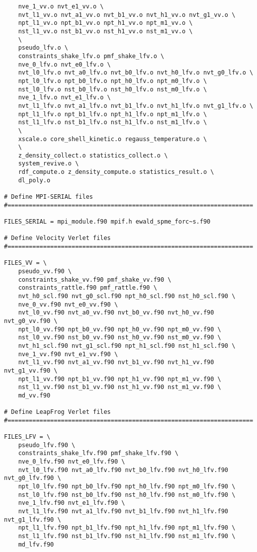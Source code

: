\begin{verbatim}
	nve_1_vv.o nvt_e1_vv.o \
	nvt_l1_vv.o nvt_a1_vv.o nvt_b1_vv.o nvt_h1_vv.o nvt_g1_vv.o \
	npt_l1_vv.o npt_b1_vv.o npt_h1_vv.o npt_m1_vv.o \
	nst_l1_vv.o nst_b1_vv.o nst_h1_vv.o nst_m1_vv.o \
	\
	pseudo_lfv.o \
	constraints_shake_lfv.o pmf_shake_lfv.o \
	nve_0_lfv.o nvt_e0_lfv.o \
	nvt_l0_lfv.o nvt_a0_lfv.o nvt_b0_lfv.o nvt_h0_lfv.o nvt_g0_lfv.o \
	npt_l0_lfv.o npt_b0_lfv.o npt_h0_lfv.o npt_m0_lfv.o \
	nst_l0_lfv.o nst_b0_lfv.o nst_h0_lfv.o nst_m0_lfv.o \
	nve_1_lfv.o nvt_e1_lfv.o \
	nvt_l1_lfv.o nvt_a1_lfv.o nvt_b1_lfv.o nvt_h1_lfv.o nvt_g1_lfv.o \
	npt_l1_lfv.o npt_b1_lfv.o npt_h1_lfv.o npt_m1_lfv.o \
	nst_l1_lfv.o nst_b1_lfv.o nst_h1_lfv.o nst_m1_lfv.o \
	\
	xscale.o core_shell_kinetic.o regauss_temperature.o \
	\
	z_density_collect.o statistics_collect.o \
	system_revive.o \
	rdf_compute.o z_density_compute.o statistics_result.o \
	dl_poly.o

# Define MPI-SERIAL files
#=====================================================================

FILES_SERIAL = mpi_module.f90 mpif.h ewald_spme_forc~s.f90

# Define Velocity Verlet files
#=====================================================================

FILES_VV = \
	pseudo_vv.f90 \
	constraints_shake_vv.f90 pmf_shake_vv.f90 \
	constraints_rattle.f90 pmf_rattle.f90 \
	nvt_h0_scl.f90 nvt_g0_scl.f90 npt_h0_scl.f90 nst_h0_scl.f90 \
	nve_0_vv.f90 nvt_e0_vv.f90 \
	nvt_l0_vv.f90 nvt_a0_vv.f90 nvt_b0_vv.f90 nvt_h0_vv.f90 nvt_g0_vv.f90 \
	npt_l0_vv.f90 npt_b0_vv.f90 npt_h0_vv.f90 npt_m0_vv.f90 \
	nst_l0_vv.f90 nst_b0_vv.f90 nst_h0_vv.f90 nst_m0_vv.f90 \
	nvt_h1_scl.f90 nvt_g1_scl.f90 npt_h1_scl.f90 nst_h1_scl.f90 \
	nve_1_vv.f90 nvt_e1_vv.f90 \
	nvt_l1_vv.f90 nvt_a1_vv.f90 nvt_b1_vv.f90 nvt_h1_vv.f90 nvt_g1_vv.f90 \
	npt_l1_vv.f90 npt_b1_vv.f90 npt_h1_vv.f90 npt_m1_vv.f90 \
	nst_l1_vv.f90 nst_b1_vv.f90 nst_h1_vv.f90 nst_m1_vv.f90 \
	md_vv.f90

# Define LeapFrog Verlet files
#=====================================================================

FILES_LFV = \
	pseudo_lfv.f90 \
	constraints_shake_lfv.f90 pmf_shake_lfv.f90 \
	nve_0_lfv.f90 nvt_e0_lfv.f90 \
	nvt_l0_lfv.f90 nvt_a0_lfv.f90 nvt_b0_lfv.f90 nvt_h0_lfv.f90 nvt_g0_lfv.f90 \
	npt_l0_lfv.f90 npt_b0_lfv.f90 npt_h0_lfv.f90 npt_m0_lfv.f90 \
	nst_l0_lfv.f90 nst_b0_lfv.f90 nst_h0_lfv.f90 nst_m0_lfv.f90 \
	nve_1_lfv.f90 nvt_e1_lfv.f90 \
	nvt_l1_lfv.f90 nvt_a1_lfv.f90 nvt_b1_lfv.f90 nvt_h1_lfv.f90 nvt_g1_lfv.f90 \
	npt_l1_lfv.f90 npt_b1_lfv.f90 npt_h1_lfv.f90 npt_m1_lfv.f90 \
	nst_l1_lfv.f90 nst_b1_lfv.f90 nst_h1_lfv.f90 nst_m1_lfv.f90 \
	md_lfv.f90


\end{verbatim}
